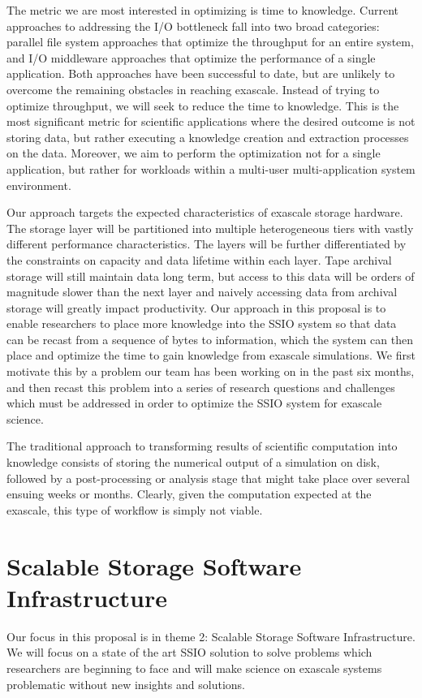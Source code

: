 The metric we are most interested in optimizing is time to knowledge.  Current
approaches to addressing the I/O bottleneck fall into two broad categories:
parallel file system approaches that optimize the throughput for an entire
system, and I/O middleware approaches that optimize the performance of a single
application. Both approaches have been successful to date, but are unlikely to
overcome the remaining obstacles in reaching exascale. 
Instead of trying to optimize throughput, we will seek to reduce the time to knowledge. 
This is the most significant metric for scientific applications where the desired outcome
is not storing data, but rather executing a knowledge creation and extraction processes 
on the data. 
Moreover, we aim to perform the optimization not for a single
application, but rather for workloads within a multi-user multi-application
system environment.

Our approach targets the expected characteristics of exascale storage hardware.
The storage layer will be partitioned into multiple heterogeneous tiers with
vastly different performance characteristics. The layers will be further
differentiated by the constraints on capacity and data lifetime within each
layer. Tape archival storage will still maintain data long term, but access to
this data will be orders of magnitude slower than the next layer and naively
accessing data from archival storage will greatly impact productivity.
%
Our approach in this proposal is to enable researchers to place more knowledge
into the SSIO system so that data can be recast from a sequence of bytes to
information, which the system can then place and optimize the time to gain
knowledge from exascale simulations.  We first motivate this by a problem our
team has been working on in the past six months, and then recast this problem
into a series of research questions and challenges which must be addressed in
order to optimize the SSIO system for exascale science.

The traditional approach to transforming results of scientific computation into
knowledge consists of storing the numerical output of a simulation on disk,
followed by a post-processing or analysis stage that might take place over
several ensuing weeks or months. Clearly, given the computation expected at the
exascale, this type of workflow is simply not viable.

%
\section{Scalable Storage Software Infrastructure}
Our focus in this proposal is in theme 2: Scalable Storage Software Infrastructure. We will focus on a state of the art
SSIO solution to solve problems which researchers are beginning to face and will make science on exascale systems
problematic without new insights and solutions.

